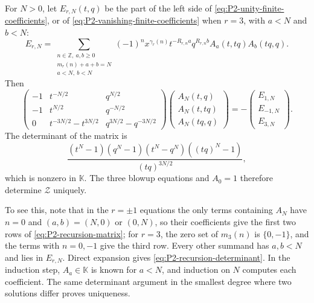 \documentclass{amsart}
\theoremstyle{definition}
\numberwithin{equation}{section}
\newcommand{\Z}{\mathbb Z}
\newcommand{\K}{\mathbb K}
\begin{document}
For \(N>0\), let \(E_{r,N}(t,q)\) be the part of the left side of \eqref{eq:P2-unity-finite-coefficients}, or of \eqref{eq:P2-vanishing-finite-coefficients} when \(r=3\), with \(a<N\) and \(b<N\):
\begin{equation}
 E_{r,N}
 =\sum_{\substack{n\in\Z,\ a,b\geq0\\
                   m_r(n)+a+b=N\\a<N,\ b<N}}
 (-1)^n x^{\gamma_r(n)}
 t^{-R_{r,n}a}q^{R_{r,n}b}
 A_a(t,tq)A_b(tq,q).
\label{eq:P2-lower-degree-remainder}
\end{equation}
Then
\begin{equation}
 \begin{pmatrix}
 -1&t^{-N/2}&q^{N/2}\\
 -1&t^{N/2}&q^{-N/2}\\
 0&t^{-3N/2}-t^{3N/2}&q^{3N/2}-q^{-3N/2}
 \end{pmatrix}
 \begin{pmatrix}
 A_N(t,q)\\ A_N(t,tq)\\ A_N(tq,q)
 \end{pmatrix}
 =-
 \begin{pmatrix}
 E_{1,N}\\ E_{-1,N}\\ E_{3,N}
 \end{pmatrix}.
\label{eq:P2-recursion-matrix}
\end{equation}
The determinant of the matrix is
\begin{equation}
 \frac{(t^N-1)(q^N-1)(t^N-q^N)((tq)^N-1)}
 {(tq)^{3N/2}},
\label{eq:P2-recursion-determinant}
\end{equation}
which is nonzero in \(\K\).  The three blowup equations and \(A_0=1\) therefore determine \(\mathcal Z\) uniquely.

To see this, note that in the \(r=\pm1\) equations the only terms containing \(A_N\) have \(n=0\) and \((a,b)=(N,0)\) or \((0,N)\), so their coefficients give the first two rows of \eqref{eq:P2-recursion-matrix}; for \(r=3\), the zero set of \(m_3(n)\) is \(\{0,-1\}\), and the terms with \(n=0,-1\) give the third row.  Every other summand has \(a,b<N\) and lies in \(E_{r,N}\).  Direct expansion gives \eqref{eq:P2-recursion-determinant}.  In the induction step, \(A_a\in\K\) is known for \(a<N\), and induction on \(N\) computes each coefficient.  The same determinant argument in the smallest degree where two solutions differ proves uniqueness.
\end{document}
